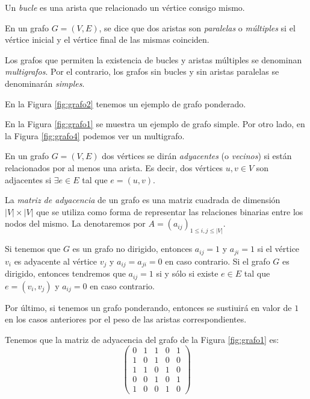 \begin{definition}
Un \emph{bucle} es una arista que relacionado un vértice consigo mismo.
\end{definition}

\begin{definition}
En un grafo $G=(V,E)$, se dice que dos aristas son \emph{paralelas} o \emph{múltiples} si el vértice inicial y el vértice final de las mismas coinciden. 

Los grafos que permiten la existencia de bucles y aristas múltiples se denominan \emph{multigrafos}. Por el contrario, los grafos sin bucles y sin aristas paralelas se denominarán \emph{simples}.
\end{definition}

\begin{exampleth}
En la Figura \ref{fig:grafo2} tenemos un ejemplo de grafo ponderado.

En la Figura \ref{fig:grafo1} se muestra un ejemplo de grafo simple. Por otro lado, en la Figura \ref{fig:grafo4} podemos ver un multigrafo.
\end{exampleth}

\begin{definition}
En un grafo $G=(V,E)$ dos vértices se dirán \emph{adyacentes} (o \emph{vecinos}) si están relacionados por al menos una arista. Es decir, dos vértices $u,v \in V$ son adjacentes si $\exists e \in E$ tal que $e = (u,v)$.

La \emph{matriz de adyacencia} de un grafo es una matriz cuadrada de dimensión $|V| \times |V|$ que se utiliza como forma de representar las relaciones binarias entre los nodos del mismo. La denotaremos por $A = (a_{ij})_{1\leq i,j\leq |V|}$.

Si tenemos que $G$ es un grafo no dirigido, entonces $a_{ij} = 1$ y $a_{ji} = 1$ si el vértice $v_i$ es adyacente al vértice $v_j$ y $a_{ij} = a_{ji} = 0$ en caso contrario. Si el grafo $G$ es dirigido, entonces tendremos que $a_{ij} = 1$ si y sólo si existe $e \in E$ tal que $e = (v_i,v_j)$ y $a_{ij} = 0$ en caso contrario.

Por último, si tenemos un grafo ponderando, entonces se sustiuirá en valor de $1$ en los casos anteriores por el peso de las aristas correspondientes.
\end{definition}

\begin{exampleth}
Tenemos que la matriz de adyacencia del grafo de la Figura \ref{fig:grafo1} es:
\begin{equation}
\begin{pmatrix}
0 & 1 & 1 & 0 & 1\\
1 & 0 & 1 & 0 & 0\\
1 & 1 & 0 & 1 & 0\\
0 & 0 & 1 & 0 & 1\\
1 & 0 & 0 & 1 & 0
\end{pmatrix}
\end{equation}
\end{exampleth}

